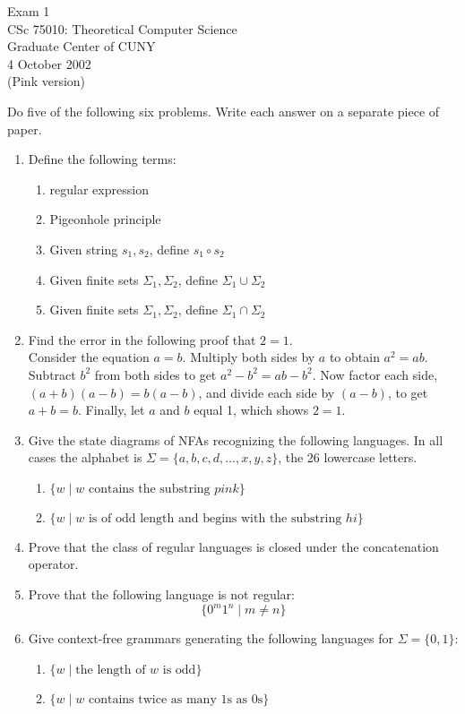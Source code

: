 \documentclass[11pt]{article}
\begin{document}
\begin{center}
	Exam 1\\
        	CSc 75010: Theoretical Computer Science\\
        	Graduate Center of CUNY\\
	4 October 2002\\
        	(Pink version)
\end{center}

Do five of the following six problems.  Write each answer on a separate
piece of paper.


\begin{enumerate}
	\item Define the following terms:
     	   \begin{enumerate}
		\item regular expression
		\item Pigeonhole principle	
		\item Given string $s_1, s_2$, define $s_1 \circ s_2$
		\item Given finite sets $\Sigma_1, \Sigma_2$, 
			define $\Sigma_1 \cup \Sigma_2$
		\item Given finite sets $\Sigma_1, \Sigma_2$, 
			define $\Sigma_1 \cap \Sigma_2$
			   \end{enumerate}
   	\item Find the error in the following proof that $2=1$.\\
		Consider the equation $a=b$.  Multiply both sides by $a$ to obtain $a^2 = ab$.
		Subtract $b^2$ from both sides to get $a^2-b^2 = ab-b^2$.  Now factor each 
		side, $(a+b)(a-b) = b(a-b)$, and divide each side by $(a-b)$, to get $a+b=b$.
		Finally, let $a$ and $b$ equal 1, which shows $2=1$.
   	\item Give the state diagrams of NFAs recognizing the following languages.  In all
	    cases the alphabet is $\Sigma = \{a,b,c,d,\ldots,x,y,z\}$, the 26 lowercase letters.
	    \begin{enumerate}
		\item $\{w \mid w \mbox{ contains the substring $pink$}\}$
		\item $\{w \mid w \mbox{ is of odd length and begins with the substring $hi$}\}$
	    \end{enumerate}
   	\item Prove that the class of regular languages is closed under the concatenation operator.
   	\item Prove that the following language is not regular:
		$$
			 \{ 0^m 1^n \mid m \neq n\}
		$$
   	\item Give context-free grammars generating the following languages for 
		$\Sigma = \{0,1\}$:
	  \begin{enumerate}
		\item $\{w \mid \mbox{the length of $w$ is odd}\}$
		\item $\{w \mid \mbox{$w$ contains twice as many $1$s as $0$s}\}$
	  \end{enumerate}

\end{enumerate}



 
\end{document}
